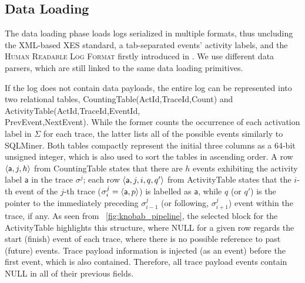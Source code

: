 \subsection{Data Loading}\label{ssec:dl}
The data loading phase   loads logs  serialized in multiple  formats, thus uncluding the XML-based XES standard, a tab-separated events' activity labels, and the \textsc{Human Readable Log Format} firstly introduced in \cite{bpm21}. We use different data parsers, which are still linked to the same data loading primitives. 

If the log does not contain data payloads, the entire log can be represented into two relational tables, \textsf{CountingTable(ActId,TraceId,Count)} and \textsf{ActivityTable(ActId,TraceId,EventId,\\PrevEvent,NextEvent)}. While the former counts the occurrence of each activation label in $\Sigma$ for each trace, the latter lists all of the possible events similarly to SQLMiner. Both tables compactly represent the initial three columns as a 64-bit unsigned integer, which is also used to sort the tables in ascending order. A row $\braket{\textsf{a},j,h}$ from \textsf{CountingTable} states that there are $h$ events exhibiting the activity label $\textsf{a}$ in the trace $\sigma^j$; each row $\braket{\textsf{a},j,i,q,q'}$ from \textsf{ActivityTable} states that the $i$-th event of the $j$-th trace ($\sigma^j_i=\braket{\textsf{a},p}$) is labelled as $\textsf{a}$, while $q$ (or $q'$) is the pointer to the immediately preceding $\sigma^j_{i-1}$ (or  following, $\sigma^j_{i+1}$) event within the trace, if any. As seen from \figurename~\ref{fig:knobab_pipeline}, the selected block for the \textsf{ActivityTable} highlights this structure, where NULL for a given row regards  the start (finish) event of each trace, where there is no possible reference to past (future) events. Trace payload information is injected (as an event) before the first event, which is also contained. Therefore, all trace payload events contain NULL in all of their previous fields.


